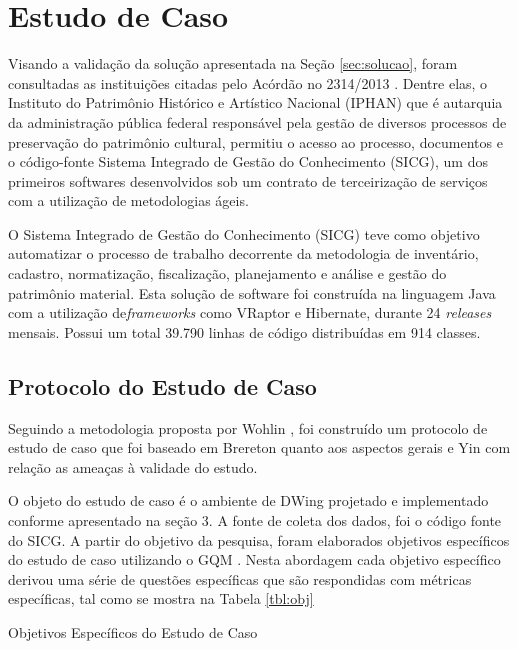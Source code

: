 \section {Estudo de Caso}

Visando a validação da solução apresentada na Seção \ref{sec:solucao}, foram consultadas as instituições citadas pelo Acórdão no 2314/2013 \cite{TCU:2013}. Dentre elas, o Instituto do Patrimônio Histórico e Artístico Nacional (IPHAN) que é autarquia da administração pública federal responsável pela gestão de diversos processos de preservação do patrimônio cultural, permitiu o acesso ao processo, documentos e o código-fonte Sistema Integrado de Gestão do Conhecimento (SICG), um dos primeiros softwares desenvolvidos sob um contrato de terceirização de serviços com a utilização de metodologias ágeis.

O Sistema Integrado de Gestão do Conhecimento (SICG) teve como objetivo automatizar o processo de trabalho decorrente da metodologia de inventário, cadastro, normatização, fiscalização, planejamento e análise e gestão do patrimônio material. Esta solução de software foi construída na linguagem Java com a utilização de\textit{frameworks} como VRaptor e Hibernate, durante 24 \textit{releases} mensais. Possui um total 39.790 linhas de código distribuídas em 914 classes.

\subsection{Protocolo do Estudo de Caso}
Seguindo a metodologia proposta por Wohlin \cite{wohlin2012experimentation}, foi construído um protocolo de estudo de caso que foi baseado em Brereton \cite{brereton2008using} quanto aos aspectos gerais e Yin \cite{yin2011applications} com relação as ameaças à validade do estudo. 

O objeto do estudo de caso é o ambiente de DWing projetado e implementado conforme apresentado na seção 3. A fonte de coleta dos dados, foi o código fonte do SICG. A partir do objetivo da pesquisa, foram elaborados objetivos específicos do estudo de caso utilizando o GQM \cite{Basili96b}. Nesta abordagem cada objetivo específico derivou uma série de questões específicas que são respondidas com métricas específicas, tal como se mostra na Tabela \ref{tbl:obj}

\begin{table}[ht]
\centering
\caption{Objetivos Específicos do Estudo de Caso}
\addtolength{\belowcaptionskip}{6pt}

\label{tbl:obj} 
\end{table}
\FloatBarrier


